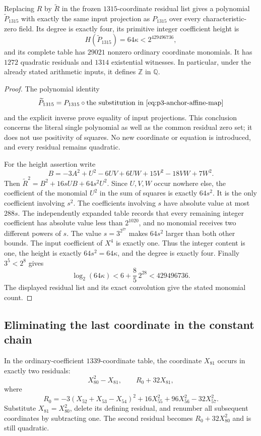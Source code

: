 \begin{proposition}\label{prop:p3-translated-quartic}
Replacing $R$ by $\widetilde R$ in the frozen $1315$-coordinate
residual list gives a polynomial $\widetilde P_{1315}$ with exactly
the same input projection as $P_{1315}$ over every characteristic-zero
field.  Its degree is exactly four, its primitive integer coefficient
height is
\[
                  H(\widetilde P_{1315})=64\kappa
                                      <2^{429496736},
\]
and its complete table has $29021$ nonzero ordinary coordinate
monomials.  It has $1272$ quadratic residuals and $1314$ existential
witnesses.  In particular, under the already stated arithmetic inputs,
it defines $\mathbb Z$ in $\mathbb Q$.
\end{proposition}
\begin{proof}
The polynomial identity
\[
 \widetilde P_{1315}
       =P_{1315}\circ\text{the substitution in
                           \eqref{eq:p3-anchor-affine-map}}
\]
and the explicit inverse prove equality of input projections.
This conclusion concerns the literal single polynomial as well as
the common residual zero set; it does not use positivity of squares.
No new coordinate or equation is introduced, and every residual
remains quadratic.

For the height assertion write
\[
 B=-3A^2+U^2-6UV+6UW+15V^2-18VW+7W^2.
\]
Then $\widetilde R^2=B^2+16sUB+64s^2U^2$.  Since $U,V,W$
occur nowhere else, the coefficient of the monomial $U^2$ in
the sum of squares is exactly $64s^2$.  It is the only coefficient
involving $s^2$.  The coefficients involving $s$ have absolute value
at most $288s$.  The independently expanded table records that
every remaining integer coefficient has absolute value less than
$2^{1020}$, and no monomial receives two different powers of $s$.
The value $s=3^{2^{27}}$ makes $64s^2$ larger than both other bounds.
The input coefficient of $X^4$ is exactly one.  Thus the integer
content is one, the height is exactly $64s^2=64\kappa$, and the
degree is exactly four.  Finally $3^5<2^8$ gives
\[
 \log_2(64\kappa)<6+\frac85\,2^{28}<429496736.
\]
The displayed residual list and its exact convolution give the
stated monomial count.
\end{proof}

\subsection{Eliminating the last coordinate in the constant chain}

In the ordinary-coefficient $1339$-coordinate table, the coordinate
$X_{81}$ occurs in exactly two residuals:
\[
                   X_{80}^2-X_{81},\qquad R_0+32X_{81},
\]
where
\[
 R_0=-3(X_{52}+X_{53}-X_{54})^2
                       +16X_{55}^2+96X_{56}^2-32X_{57}^2.
\]
Substitute $X_{81}=X_{80}^2$, delete its defining residual, and
renumber all subsequent coordinates by subtracting one.  The second
residual becomes $R_0+32X_{80}^2$ and is still quadratic.

